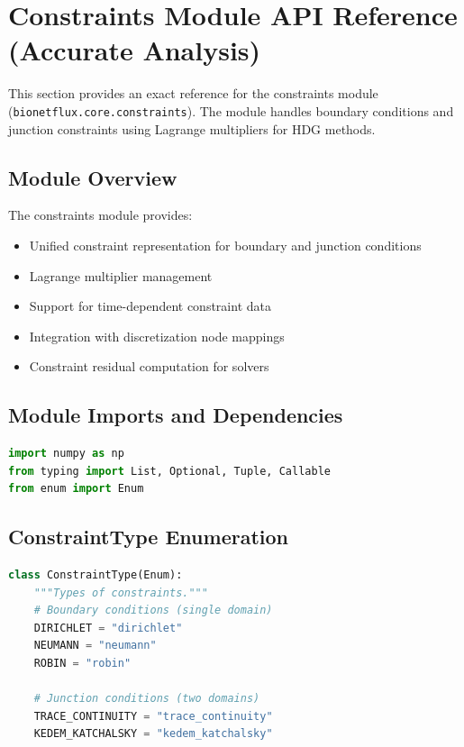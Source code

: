 %

\section{Constraints Module API Reference (Accurate Analysis)}
\label{sec:constraints_module_api}

This section provides an exact reference for the constraints module (\texttt{bionetflux.core.constraints}). The module handles boundary conditions and junction constraints using Lagrange multipliers for HDG methods.

\subsection{Module Overview}

The constraints module provides:
\begin{itemize}
    \item Unified constraint representation for boundary and junction conditions
    \item Lagrange multiplier management
    \item Support for time-dependent constraint data
    \item Integration with discretization node mappings
    \item Constraint residual computation for  solvers
\end{itemize}

\subsection{Module Imports and Dependencies}

\begin{lstlisting}[language=Python, caption=Module Dependencies]
import numpy as np
from typing import List, Optional, Tuple, Callable
from enum import Enum
\end{lstlisting}

\subsection{ConstraintType Enumeration}
\label{subsec:constraint_type_enum}

\begin{lstlisting}[language=Python, caption=ConstraintType Enumeration]
class ConstraintType(Enum):
    """Types of constraints."""
    # Boundary conditions (single domain)
    DIRICHLET = "dirichlet"
    NEUMANN = "neumann"
    ROBIN = "robin"
    
    # Junction conditions (two domains)
    TRACE_CONTINUITY = "trace_continuity"
    KEDEM_KATCHALSKY = "kedem_katchalsky"
\end{lstlisting}


